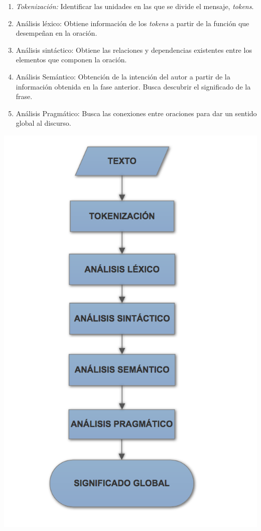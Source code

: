		\begin{minipage}{.65\textwidth}
			\begin{enumerate}%
				\item \textit{Tokenización: }  Identificar las unidades en las que se divide el mensaje, \textit{tokens}.
				\item Análisis léxico: Obtiene información de los \textit{tokens} a partir de la función que desempeñan en la oración.
				\item Análisis sintáctico: Obtiene las relaciones y dependencias existentes entre los elementos que componen la oración.
				\item Análisis Semántico: Obtención de la intención del autor a partir de la información obtenida en la fase anterior. Busca descubrir el significado de la frase.
				\item Análisis Pragmático: Busca las conexiones entre oraciones para dar un sentido global al discurso.
			\end{enumerate}
		\end{minipage}
		\begin{minipage}{.35\textwidth}
				\includegraphics[width=1\linewidth]{imagenes/flujo}
		\end{minipage}



